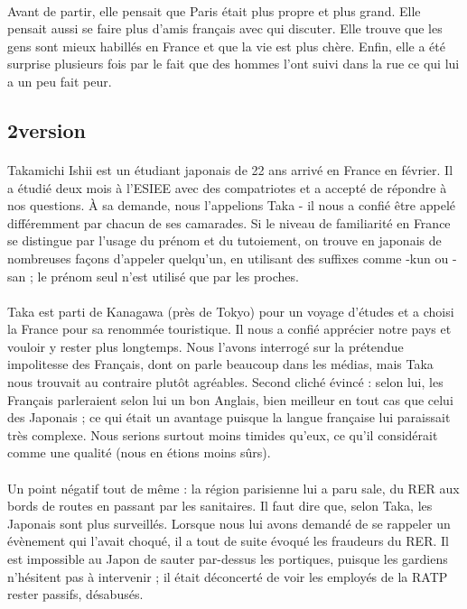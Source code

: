 \paragraph{}
Avant de partir, elle pensait que Paris était plus propre et plus grand. Elle pensait aussi se faire plus d’amis français avec qui discuter.  Elle trouve que les gens sont mieux habillés en France et que la vie est plus chère. Enfin,  elle a été surprise plusieurs fois par le fait que des hommes l’ont suivi dans la rue ce qui lui a un peu fait peur.


\subsection{2\ieme version}
\paragraph{}
Takamichi Ishii est un étudiant japonais de 22 ans arrivé en France en février. Il a étudié deux mois à l’ESIEE avec des compatriotes et a accepté de répondre à nos questions. À sa demande, nous l’appelions Taka - il nous a confié être appelé différemment par chacun de ses camarades. Si le niveau de familiarité en France se distingue par l’usage du prénom et du tutoiement, on trouve en japonais de nombreuses façons d’appeler quelqu’un, en utilisant des suffixes comme -kun ou -san ; le prénom seul n’est utilisé que par les proches.
\paragraph{}
Taka est parti de Kanagawa (près de Tokyo) pour un voyage d’études et a choisi la France pour sa renommée touristique. Il nous a confié apprécier notre pays et vouloir y rester plus longtemps. Nous l’avons interrogé sur la prétendue impolitesse des Français, dont on parle beaucoup dans les médias, mais Taka nous trouvait au contraire plutôt agréables. Second cliché évincé : selon lui, les Français parleraient selon lui un bon Anglais, bien meilleur en tout cas  que celui des Japonais ; ce qui était un avantage puisque la langue française lui paraissait très complexe. Nous serions surtout moins timides qu’eux, ce qu’il considérait comme une qualité (nous en étions moins sûrs).
\paragraph{}
Un point négatif tout de même : la région parisienne lui a paru sale, du RER aux bords de routes en passant par les sanitaires. Il faut dire que, selon Taka, les Japonais sont plus surveillés. Lorsque nous lui avons demandé de se rappeler un évènement qui l’avait choqué, il a tout de suite évoqué les fraudeurs du RER. Il est impossible au Japon de sauter par-dessus les portiques, puisque les gardiens n’hésitent pas à intervenir ; il était déconcerté de voir les employés de la RATP rester passifs, désabusés.
